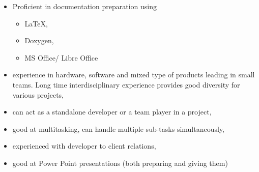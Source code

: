 \documentclass{tccv}
\begin{document}
\begin{itemize}
	\item Proficient in documentation preparation using 
	\begin{itemize}
		\item \LaTeX, 
		\item Doxygen,
		\item MS Office/ Libre Office
	\end{itemize}
	\item experience in hardware, software and mixed type of products leading in small teams. Long time interdisciplinary experience provides good diversity for various projects,
	\item can act as a standalone developer or a team player in a project,
	\item good at multitasking, can handle multiple sub-tasks simultaneously,
	\item experienced with developer to client relations,
	\item good at Power Point presentations (both preparing and giving them)
	 
\end{itemize}
\end{document}
